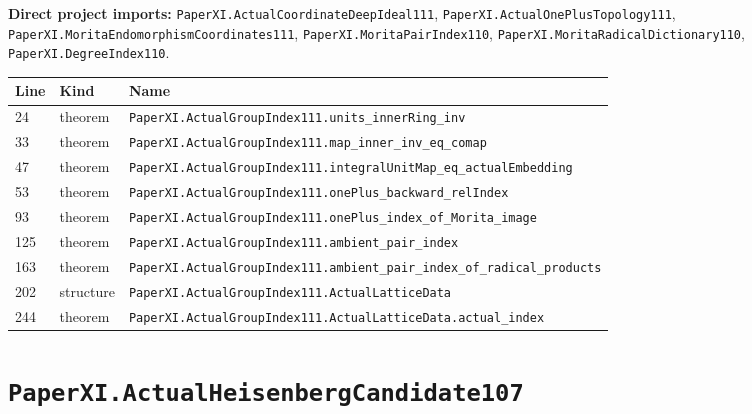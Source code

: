 \documentclass[10pt,oneside]{book}
\begin{document}

\textbf{Direct project imports:} \nolinkurl{PaperXI.ActualCoordinateDeepIdeal111}, \nolinkurl{PaperXI.ActualOnePlusTopology111}, \nolinkurl{PaperXI.MoritaEndomorphismCoordinates111}, \nolinkurl{PaperXI.MoritaPairIndex110}, \nolinkurl{PaperXI.MoritaRadicalDictionary110}, \nolinkurl{PaperXI.DegreeIndex110}.

\begin{longtable}{@{}p{}p{}p{}@{}}\toprule Line&Kind&Name\\\midrule\endhead

24&theorem&\nolinkurl{PaperXI.ActualGroupIndex111.units_innerRing_inv}\\

33&theorem&\nolinkurl{PaperXI.ActualGroupIndex111.map_inner_inv_eq_comap}\\

47&theorem&\nolinkurl{PaperXI.ActualGroupIndex111.integralUnitMap_eq_actualEmbedding}\\

53&theorem&\nolinkurl{PaperXI.ActualGroupIndex111.onePlus_backward_relIndex}\\

93&theorem&\nolinkurl{PaperXI.ActualGroupIndex111.onePlus_index_of_Morita_image}\\

125&theorem&\nolinkurl{PaperXI.ActualGroupIndex111.ambient_pair_index}\\

163&theorem&\nolinkurl{PaperXI.ActualGroupIndex111.ambient_pair_index_of_radical_products}\\

202&structure&\nolinkurl{PaperXI.ActualGroupIndex111.ActualLatticeData}\\

244&theorem&\nolinkurl{PaperXI.ActualGroupIndex111.ActualLatticeData.actual_index}\\

\bottomrule\end{longtable}

\section{\texorpdfstring{\nolinkurl{PaperXI.ActualHeisenbergCandidate107}}{PaperXI.ActualHeisenbergCandidate107}}\label{module:PaperXI.ActualHeisenbergCandidate107}
\end{document}
